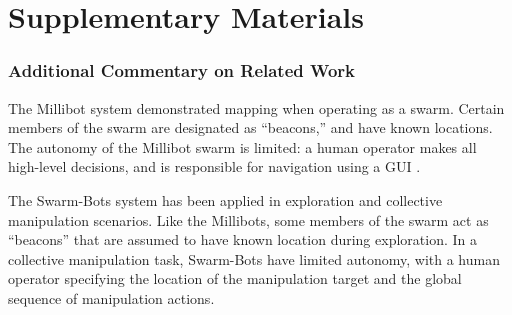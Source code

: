 \documentclass[12pt]{article}
\begin{document}
\part*{Supplementary Materials}


\section{Additional Commentary on Related Work}\label{sec:related-work}
%
%

The Millibot system demonstrated mapping when operating as a swarm. Certain members of the swarm are designated as ``beacons,'' and have known locations. The autonomy of the Millibot swarm is limited: a human operator makes all high-level decisions, and is responsible for navigation using a GUI \cite{Grabowski2000}.

The Swarm-Bots system has been applied in exploration \cite{Dorigo2005} and collective manipulation \cite{Mondada2005} scenarios.  Like the Millibots, some members of the swarm act as ``beacons'' that are assumed to have known location during exploration.  In a collective manipulation task, Swarm-Bots have limited autonomy, with a human operator specifying the location of the manipulation target and the global sequence of manipulation actions.
\end{document}
